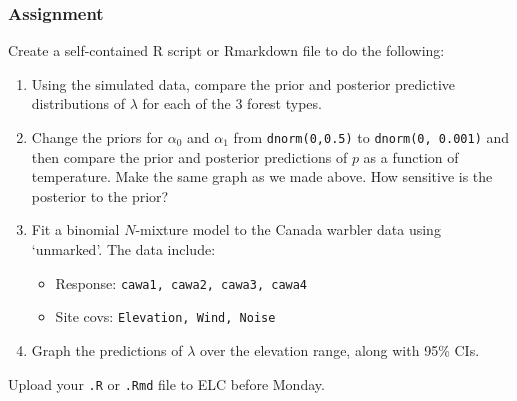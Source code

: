 \documentclass[color=usenames,dvipsnames]{beamer}\usepackage[]{graphicx}\usepackage[]{color}
\newcommand{\inr}[1]{\colorbox{inlinecolor}{\texttt{#1}}}
\begin{document}
\begin{frame}[fragile]
  \frametitle{Assignment}
  \footnotesize
  Create a self-contained R script or Rmarkdown file
  to do the following:
  \vfill
  \begin{enumerate}
    \footnotesize
    \item Using the simulated data, compare the prior and posterior
      predictive distributions of $\lambda$ for each of the 3 forest
      types. 
    \item Change the priors for $\alpha_0$ and $\alpha_1$ from
      \inr{dnorm(0,0.5)} to \inr{dnorm(0, 0.001)} and then compare the
      prior and posterior predictions of $p$ as a function of
      temperature. Make the same graph as we made above. How
      sensitive is the posterior to the prior?
    \item Fit a binomial $N$-mixture model to the Canada warbler data
      using `unmarked'. The data include: 
      \begin{itemize}
        \footnotesize
        \item Response: \texttt{cawa1, cawa2, cawa3, cawa4}
        \item Site covs: \texttt{Elevation, Wind, Noise}
      \end{itemize}
    \item Graph the predictions of $\lambda$ over the 
      elevation range, along with 95\% CIs.
  \end{enumerate}
  \vfill
  Upload your {\tt .R} or {\tt .Rmd} file to ELC before Monday. 
\end{frame}
\end{document}
